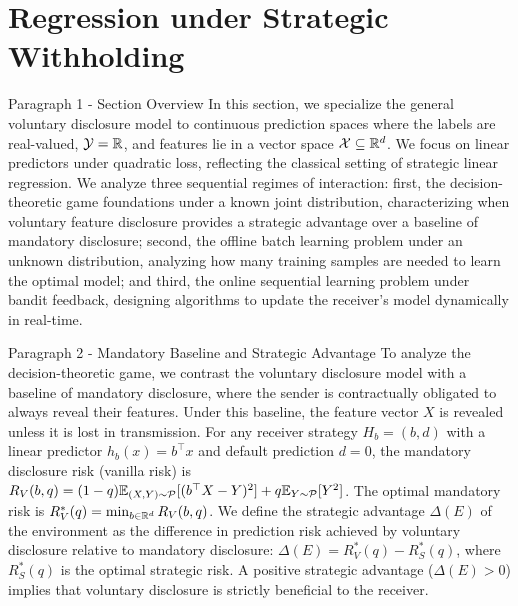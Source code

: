 \section{Regression under Strategic Withholding}
\label{sec:regression}

\begin{sourceblock}{Paragraph 1 - Section Overview}
In this section, we specialize the general voluntary disclosure model to continuous prediction spaces where the labels are real-valued, $\mathcal{Y} = \mathbb{R}$, and features lie in a vector space $\mathcal{X} \subseteq \mathbb{R}^d$. We focus on linear predictors under quadratic loss, reflecting the classical setting of strategic linear regression. We analyze three sequential regimes of interaction: first, the decision-theoretic game foundations under a known joint distribution, characterizing when voluntary feature disclosure provides a strategic advantage over a baseline of mandatory disclosure; second, the offline batch learning problem under an unknown distribution, analyzing how many training samples are needed to learn the optimal model; and third, the online sequential learning problem under bandit feedback, designing algorithms to update the receiver's model dynamically in real-time.
\end{sourceblock}

\begin{faqblock}
\faqanswers
{}
\end{faqblock}

\begin{sourceblock}{Paragraph 2 - Mandatory Baseline and Strategic Advantage}
To analyze the decision-theoretic game, we contrast the voluntary disclosure model with a baseline of mandatory disclosure, where the sender is contractually obligated to always reveal their features. Under this baseline, the feature vector $X$ is revealed unless it is lost in transmission. For any receiver strategy $H_b = (b, d)$ with a linear predictor $h_b(x) = b^\top x$ and default prediction $d = 0$, the mandatory disclosure risk (vanilla risk) is $R_V(b, q) = (1 - q)\mathbb{E}_{(X, Y) \sim \mathcal{P}} [ (b^\top X - Y)^2 ] + q\mathbb{E}_{Y \sim \mathcal{P}} [ Y^2 ]$. The optimal mandatory risk is $R_V^*(q) = \min_{b \in \mathbb{R}^d} R_V(b, q)$. We define the strategic advantage $\Delta(E)$ of the environment as the difference in prediction risk achieved by voluntary disclosure relative to mandatory disclosure: $\Delta(E) = R_V^*(q) - R_S^*(q)$, where $R_S^*(q)$ is the optimal strategic risk. A positive strategic advantage ($\Delta(E) > 0$) implies that voluntary disclosure is strictly beneficial to the receiver.
\end{sourceblock}

